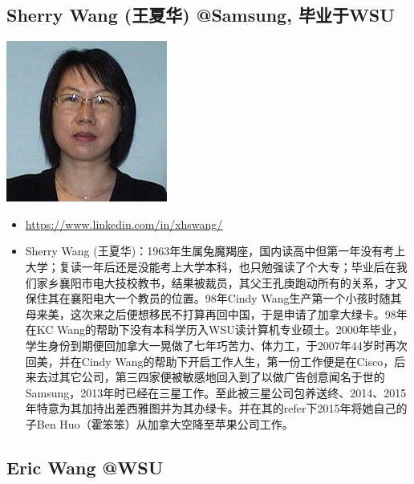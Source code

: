 \documentclass[9pt, b5paper]{article}
\begin{document}
\subsection{Sherry Wang (王夏华) @Samsung, 毕业于WSU}
\label{sec:org0841f0a}

\begin{center}
\includegraphics[width=.9\linewidth]{./pic/Sherry Wang.jpg}
\end{center}
\begin{itemize}
\item \url{https://www.linkedin.com/in/xhswang/}
\item Sherry Wang (王夏华)：1963年生属兔魔羯座，国内读高中但第一年没有考上大学；复读一年后还是没能考上大学本科，也只勉强读了个大专；毕业后在我们家乡襄阳市电大技校教书，结果被裁员，其父王孔庚跑动所有的关系，才又保住其在襄阳电大一个教员的位置。98年Cindy Wang生产第一个小孩时随其母来美，这次来之后便想移民不打算再回中国，于是申请了加拿大绿卡。98年在KC Wang的帮助下没有本科学历入WSU读计算机专业硕士。2000年毕业，学生身份到期便回加拿大一晃做了七年巧苦力、体力工，于2007年44岁时再次回美，并在Cindy Wang的帮助下开启工作人生，第一份工作便是在Cisco，后来去过其它公司，第三四家便被敏感地回入到了以做广告创意闻名于世的Samsung，2013年时已经在三星工作。至此被三星公司包养送终、2014、2015年特意为其加持出差西雅图并为其办绿卡。并在其的refer下2015年将她自己的子Ben Huo（霍笨笨）从加拿大空降至苹果公司工作。
\end{itemize}
\subsection{Eric Wang @WSU}
\label{sec:org1b5cd0e}
\end{document}
